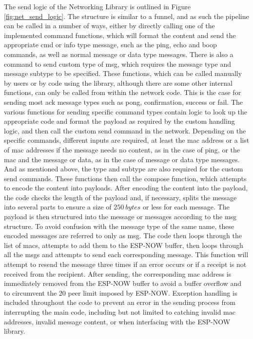 The send logic of the Networking Library is outlined in Figure \ref{fig:net_send_logic}. The structure is similar to a funnel, and as such the pipeline can be called in a number of ways, either by directly calling one of the implemented command functions, which will format the content and send the appropriate cmd or info type message, such as the ping, echo and boop commands, as well as normal message or data type messages. There is also a command to send custom type of msg, which requires the message type and message subtype to be specified. These functions, which can be called manually by users or by code using the library, although there are some other internal functions, can only be called from within the network code. This is the case for sending most ack message types such as pong, confirmation, success or fail. The various functions for sending specific command types contain logic to look up the appropriate code and format the payload as required by the custom handling logic, and then call the custom send command in the network. Depending on the specific commands, different inputs are required, at least the mac address or a list of mac addresses if the message needs no content, as in the case of ping, or the mac and the message or data, as in the case of message or data type messages. And as mentioned above, the type and subtype are also required for the custom send commands. These functions then call the compose function, which attempts to encode the content into payloads. After encoding the content into the payload, the code checks the length of the payload and, if necessary, splits the message into several parts to ensure a size of $250\ bytes$ or less for each message. The payload is then structured into the message or messages according to the msg structure. To avoid confusion with the message type of the same name, these encoded messages are referred to only as msg. The code then loops through the list of macs, attempts to add them to the ESP-NOW buffer, then loops through all the msgs and attempts to send each corresponding message. This function will attempt to resend the message three times if an error occurs or if a receipt is not received from the recipient. After sending, the corresponding mac address is immediately removed from the ESP-NOW buffer to avoid a buffer overflow and to circumvent the 20 peer limit imposed by ESP-NOW. Exception handling is included throughout the code to prevent an error in the sending process from interrupting the main code, including but not limited to catching invalid mac addresses, invalid message content, or when interfacing with the ESP-NOW library.

